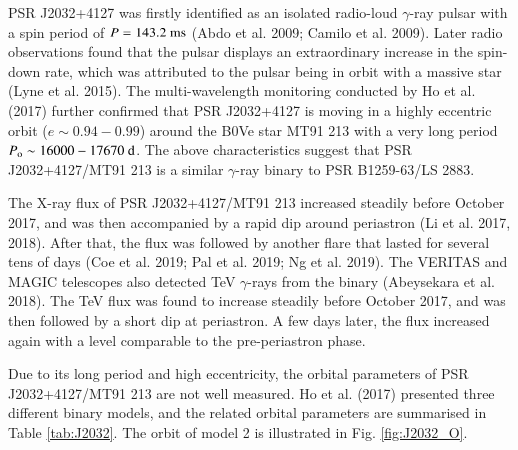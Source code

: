 \documentclass{aa}
\def\PSRB1259{PSR B1259-63/LS 2883}
\def\PSRJ2032{PSR J2032+4127/MT91 213}
\begin{document}
PSR J2032+4127 was firstly identified as an isolated radio-loud $\gamma$-ray pulsar with a spin period of $P=143.2\ {\rm ms}$ (Abdo et al. 2009; Camilo et al. 2009). Later radio observations found that the pulsar displays an extraordinary increase in the spin-down rate, which was attributed to the pulsar being in orbit with a massive star (Lyne et al. 2015).
The multi-wavelength monitoring conducted by Ho et al. (2017) further confirmed that PSR J2032+4127 is moving in a highly eccentric orbit ($e\sim0.94-0.99$) around the B0Ve star MT91 213 with a very long period $P_{\rm o}\sim 16000-17670\ {\rm d}$. The above characteristics suggest that \PSRJ2032 is a similar $\gamma$-ray binary to \PSRB1259.

The X-ray flux of \PSRJ2032 increased steadily before October 2017, and was then accompanied by a rapid dip around periastron (Li et al. 2017, 2018). After that, the flux was followed by another flare that lasted for several tens of days (Coe et al. 2019; Pal et al. 2019; Ng et al. 2019).
The VERITAS and MAGIC telescopes also detected TeV $\gamma$-rays from the binary (Abeysekara et al. 2018). The TeV flux was found to increase steadily before October 2017, and was then followed by a short dip at periastron. A few days later, the flux increased again with a level comparable to the pre-periastron phase.

Due to its long period and high eccentricity, the orbital parameters of \PSRJ2032 are not well measured. Ho et al. (2017) presented three different binary models, and the related orbital parameters are summarised in Table \ref{tab:J2032}. The orbit of model 2 is illustrated in Fig. \ref{fig:J2032_O}.
\end{document}
